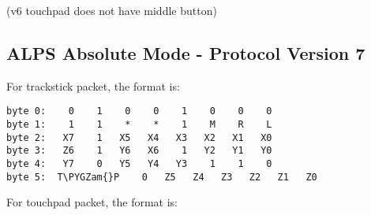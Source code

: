 \documentclass[a4paper,8pt,english]{sphinxmanual}
\def\PYGZam{\char`\&}
\begin{document}
(v6 touchpad does not have middle button)


\subsection{ALPS Absolute Mode - Protocol Version 7}
\label{input/devices/alps:alps-absolute-mode-protocol-version-7}
For trackstick packet, the format is:

\begin{Verbatim}[commandchars=\\\{\}]
byte 0:    0    1    0    0    1    0    0    0
byte 1:    1    1    *    *    1    M    R    L
byte 2:   X7    1   X5   X4   X3   X2   X1   X0
byte 3:   Z6    1   Y6   X6    1   Y2   Y1   Y0
byte 4:   Y7    0   Y5   Y4   Y3    1    1    0
byte 5:  T\PYGZam{}P    0   Z5   Z4   Z3   Z2   Z1   Z0
\end{Verbatim}

For touchpad packet, the format is:
\end{document}
